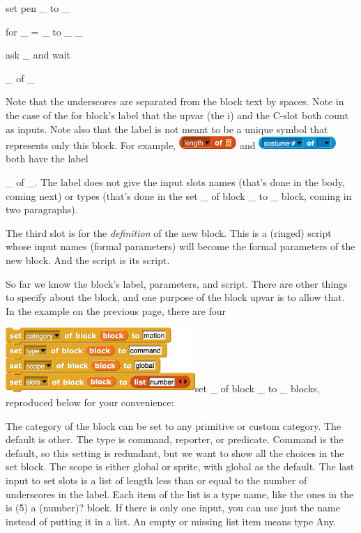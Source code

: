 set pen \_ to \_

for \_ = \_ to \_ \_

ask \_ and wait

\_ of \_

Note that the underscores are separated from the block text by spaces.
Note in the case of the for block's label that the upvar (the i) and the
C-slot both count as inputs. Note also that the label is not meant to be
a unique symbol that represents only this block. For example,
\includegraphics[width=0.86111in,height=0.19444in]{media/image628.png}
and \includegraphics[width=1.15in,height=0.19in]{media/image376.png}
both have the label

\_ of \_. The label does not give the input slots names (that's done in
the body, coming next) or types (that's done in the set \_ of block \_
to \_ block, coming in two paragraphs).

The third slot is for the \emph{definition} of the new block. This is a
(ringed) script whose input names (formal parameters) will become the
formal parameters of the new block. And the script is its script.

So far we know the block's label, parameters, and script. There are
other things to specify about the block, and one purpose of the block
upvar is to allow that. In the example on the previous page, there are
four

\includegraphics[width=2.83in,height=0.97in]{media/image951.png}set \_
of block \_ to \_ blocks, reproduced below for your convenience:

The category of the block can be set to any primitive or custom
category. The default is other. The type is command, reporter, or
predicate. Command is the default, so this setting is redundant, but we
want to show all the choices in the set block. The scope is either
global or sprite, with global as the default. The last input to set
slots is a list of length less than or equal to the number of
underscores in the label. Each item of the list is a type name, like the
ones in the is (5) a (number)? block. If there is only one input, you
can use just the name instead of putting it in a list. An empty or
missing list item means type Any.

